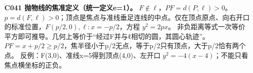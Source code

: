 \textbf{C041 抛物线的焦准定义（统一定义e=1）。} $F\notin\ell$，$PF=d(P,\ell)>0$。
$p=d(F,\ell)>0$；顶点是焦点与准线垂足连线的中点。仅在顶点原点、向右开口的标准位置，$F(p/2,0),\ell:x=-p/2$，方程 $y^2=2px$。
非负距离等式一次等价平方即可推导。几何上等价于“经过F并与ℓ相切的圆，其圆心轨迹”。
$PF=x+p/2\ge p/2$，焦半径小于p/2无点，等于p/2只有顶点，大于p/2恰有两个点。
反例：F(3,0)、准线x=5得到顶点(4,0)、左开口 $y^2=-4(x-4)$；不能只看焦点横坐标的正负。
